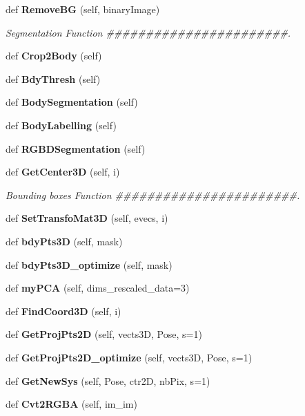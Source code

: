 \begin{DoxyCompactItemize}
def \textbf{ Remove\+BG} (self, binary\+Image)
\begin{DoxyCompactList}\small\item\em Segmentation Function \#\#\#\#\#\#\#\#\#\#\#\#\#\#\#\#\#\#\#\#\#\#\#. \end{DoxyCompactList}\item 
def \textbf{ Crop2\+Body} (self)
\item 
def \textbf{ Bdy\+Thresh} (self)
\item 
def \textbf{ Body\+Segmentation} (self)
\item 
def \textbf{ Body\+Labelling} (self)
\item 
def \textbf{ R\+G\+B\+D\+Segmentation} (self)
\item 
def \textbf{ Get\+Center3D} (self, i)
\begin{DoxyCompactList}\small\item\em Bounding boxes Function \#\#\#\#\#\#\#\#\#\#\#\#\#\#\#\#\#\#\#\#\#\#\#. \end{DoxyCompactList}\item 
def \textbf{ Set\+Transfo\+Mat3D} (self, evecs, i)
\item 
def \textbf{ bdy\+Pts3D} (self, mask)
\item 
def \textbf{ bdy\+Pts3\+D\+\_\+optimize} (self, mask)
\item 
def \textbf{ my\+P\+CA} (self, dims\+\_\+rescaled\+\_\+data=3)
\item 
def \textbf{ Find\+Coord3D} (self, i)
\item 
def \textbf{ Get\+Proj\+Pts2D} (self, vects3D, Pose, s=1)
\item 
def \textbf{ Get\+Proj\+Pts2\+D\+\_\+optimize} (self, vects3D, Pose, s=1)
\item 
def \textbf{ Get\+New\+Sys} (self, Pose, ctr2D, nb\+Pix, s=1)
\item 
def \textbf{ Cvt2\+R\+G\+BA} (self, im\+\_\+im)
\end{DoxyCompactItemize}
